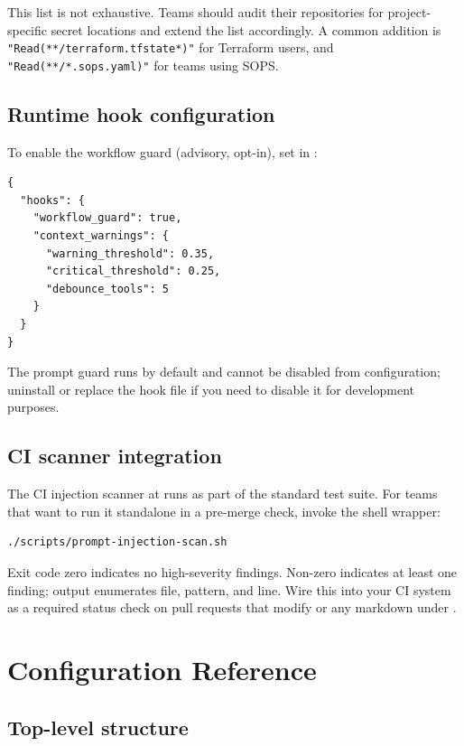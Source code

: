\documentclass[11pt,letterpaper,openany]{book}
\begin{document}
This list is not exhaustive. Teams should audit their repositories for project-specific secret locations and extend the list accordingly. A common addition is \texttt{"Read(**/terraform.tfstate*)"} for Terraform users, and \texttt{"Read(**/*.sops.yaml)"} for teams using SOPS.

\section{Runtime hook configuration}

To enable the workflow guard (advisory, opt-in), set in :

\begin{lstlisting}
{
  "hooks": {
    "workflow_guard": true,
    "context_warnings": {
      "warning_threshold": 0.35,
      "critical_threshold": 0.25,
      "debounce_tools": 5
    }
  }
}
\end{lstlisting}

The prompt guard runs by default and cannot be disabled from configuration; uninstall or replace the hook file if you need to disable it for development purposes.

\section{CI scanner integration}

The CI injection scanner at  runs as part of the standard test suite. For teams that want to run it standalone in a pre-merge check, invoke the shell wrapper:

\begin{lstlisting}
./scripts/prompt-injection-scan.sh
\end{lstlisting}

Exit code zero indicates no high-severity findings. Non-zero indicates at least one finding; output enumerates file, pattern, and line. Wire this into your CI system as a required status check on pull requests that modify  or any markdown under .

\chapter{Configuration Reference}

\section{Top-level structure}
\end{document}
